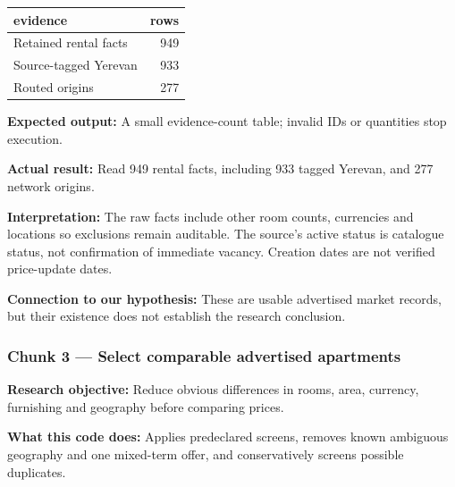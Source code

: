 \documentclass[
]{article}
\newenvironment{Shaded}{\begin{snugshade}}{\end{snugshade}}
\newcommand{\FunctionTok}[1]{\textcolor[rgb]{0.13,0.29,0.53}{\textbf{#1}}}
\newcommand{\NormalTok}[1]{#1}
\newcommand{\OtherTok}[1]{\textcolor[rgb]{0.56,0.35,0.01}{#1}}
\newcommand{\SpecialCharTok}[1]{\textcolor[rgb]{0.81,0.36,0.00}{\textbf{#1}}}
\newcommand{\StringTok}[1]{\textcolor[rgb]{0.31,0.60,0.02}{#1}}
\newcounter{none} %
\begin{document}
{\def\LTcaptype{none} %
\begin{longtable}[]{@{}lr@{}}
\toprule\noalign{}
evidence & rows \\
\midrule\noalign{}
\endhead
\bottomrule\noalign{}
\endlastfoot
Retained rental facts & 949 \\
Source-tagged Yerevan & 933 \\
Routed origins & 277 \\
\end{longtable}
}

\begin{Shaded}
\end{Shaded}

\textbf{Expected output:} A small evidence-count table; invalid IDs or
quantities stop execution.

\textbf{Actual result:} Read 949 rental facts, including 933 tagged
Yerevan, and 277 network origins.

\textbf{Interpretation:} The raw facts include other room counts,
currencies and locations so exclusions remain auditable. The source's
active status is catalogue status, not confirmation of immediate
vacancy. Creation dates are not verified price-update dates.

\textbf{Connection to our hypothesis:} These are usable advertised
market records, but their existence does not establish the research
conclusion.

\subsubsection{Chunk 3 --- Select comparable advertised
apartments}\label{chunk-3-select-comparable-advertised-apartments}

\textbf{Research objective:} Reduce obvious differences in rooms, area,
currency, furnishing and geography before comparing prices.

\textbf{What this code does:} Applies predeclared screens, removes known
ambiguous geography and one mixed-term offer, and conservatively screens
possible duplicates.
\end{document}
